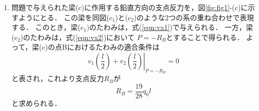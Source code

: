 \documentclass[10pt,a4j]{jarticle}
\begin{document}
\begin{enumerate}
\item
問題で与えられた梁(c)に作用する鉛直方向の支点反力を，図\ref{fig:fig1}-(c)に示すようにとる．
この梁を同図(c$_1$)と(c$_2$)のような2つの系の重ね合わせで表現する．
このとき，梁(c$_1)$のたわみは，式(\ref{eqn:vx1})で与えられる．
一方，梁(c$_2$)のたわみは，式(\ref{eqn:vx2})において
$P=-R_B$とすることで得られる．
よって，梁(c)の点Bにおけるたわみの適合条件は
\begin{equation}
	v_1\left( \frac{l}{2}\right) 
	+
	\left. v_2\left( \frac{l}{2}\right)  \right|_{P=-R_B}=0
\end{equation}
と表され，これより支点反力$R_B$が
\begin{equation}
	R_B=\frac{19}{28}q_0l
	\label{eqn:RB}
\end{equation}
と求められる．\\


\end{enumerate}
\end{document}
